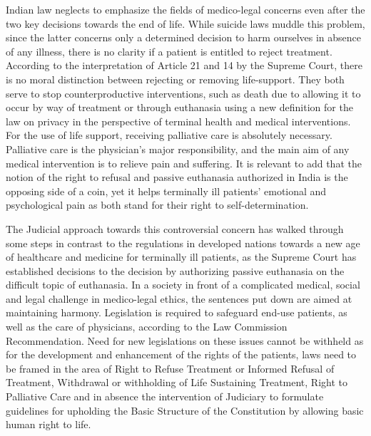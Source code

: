 \begin{multicols}{2}

\noi
Indian law neglects to emphasize the fields of medico-legal concerns even after the two key
decisions towards the end of life. While suicide laws muddle this problem, since the latter
concerns only a determined decision to harm ourselves in absence of any illness, there is no
clarity if a patient is entitled to reject treatment. According to the interpretation of Article 21
and 14 by the Supreme Court, there is no moral distinction between rejecting or removing
life-support. They both serve to stop counterproductive interventions, such as death due to
allowing it to occur by way of treatment or through euthanasia using a new definition for the
law on privacy in the perspective of terminal health and medical interventions. For the use of 
life support, receiving palliative care is absolutely necessary. Palliative care is the physician’s
major responsibility, and the main aim of any medical intervention is to relieve pain and
suffering. It is relevant to add that the notion of the right to refusal and passive euthanasia
authorized in India is the opposing side of a coin, yet it helps terminally ill patients’
emotional and psychological pain as both stand for their right to self-determination.

\noi
The Judicial approach towards this controversial concern has walked through some steps in
contrast to the regulations in developed nations towards a new age of healthcare and medicine
for terminally ill patients, as the Supreme Court has established decisions to the decision by
authorizing passive euthanasia on the difficult topic of euthanasia. In a society in front of a
complicated medical, social and legal challenge in medico-legal ethics, the sentences put
down are aimed at maintaining harmony. Legislation is required to safeguard end-use
patients, as well as the care of physicians, according to the Law Commission
Recommendation. Need for new legislations on these issues cannot be withheld as for the
development and enhancement of the rights of the patients, laws need to be framed in the area
of Right to Refuse Treatment or Informed Refusal of Treatment, Withdrawal or withholding
of Life Sustaining Treatment, Right to Palliative Care and in absence the intervention of
Judiciary to formulate guidelines for upholding the Basic Structure of the Constitution by
allowing basic human right to life.

\end{multicols}
